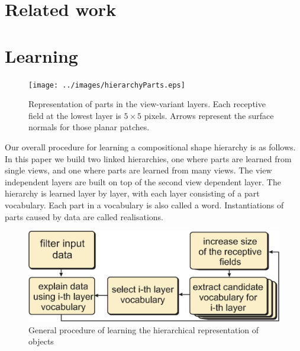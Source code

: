 \documentclass[letterpaper,10pt,conference]{ieeeconf}  %
\begin{document}
\section{Related work}

\section{Learning}

\begin{figure}[t]
 \centering
\texttt{[image: ../images/hierarchyParts.eps]}
\caption{Representation of parts in the view-variant layers. Each receptive field at the lowest layer is $5 \times 5$ pixels. Arrows represent the surface normals for those planar patches.}
 \label{hierarchyParts}
\end{figure}

Our overall procedure for learning a compositional shape hierarchy is as follows. In this paper we build two linked hierarchies, one where parts are learned from single views, and one where parts are learned from many views. The view independent layers are built on top of the second view dependent layer. The hierarchy is learned layer by layer, with each layer consisting of a part vocabulary. Each part in a vocabulary is also called a word. Instantiations of parts caused by data are called realisations. 

\begin{figure}[t]
 \centering
\includegraphics[width=0.9\columnwidth]{../images/learningGeneral.eps}
\caption{General procedure of learning the hierarchical representation of objects}
 \label{hopProc}
\end{figure}
\end{document}
